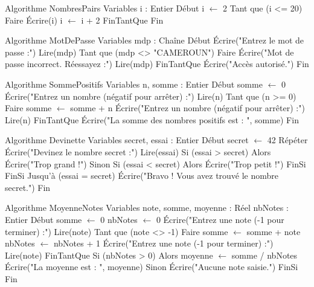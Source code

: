 \begin{algo}
Algorithme NombresPairs
Variables
    i : Entier
Début
    i $\leftarrow$ 2
    Tant que (i <= 20) Faire
        Écrire(i)
        i $\leftarrow$ i + 2
    FinTantQue
Fin
\end{algo}

\begin{algo}
Algorithme MotDePasse
Variables
    mdp : Chaîne
Début
    Écrire("Entrez le mot de passe :")
    Lire(mdp)
    Tant que (mdp <> "CAMEROUN") Faire
        Écrire("Mot de passe incorrect. Réessayez :")
        Lire(mdp)
    FinTantQue
    Écrire("Accès autorisé.")
Fin
\end{algo}

\begin{algo}
Algorithme SommePositifs
Variables
    n, somme : Entier
Début
    somme $\leftarrow$ 0
    Écrire("Entrez un nombre (négatif pour arrêter) :")
    Lire(n)
    Tant que (n >= 0) Faire
        somme $\leftarrow$ somme + n
        Écrire("Entrez un nombre (négatif pour arrêter) :")
        Lire(n)
    FinTantQue
    Écrire("La somme des nombres positifs est : ", somme)
Fin
\end{algo}

\begin{algo}
Algorithme Devinette
Variables
    secret, essai : Entier
Début
    secret $\leftarrow$ 42
    Répéter
        Écrire("Devinez le nombre secret :")
        Lire(essai)
        Si (essai > secret) Alors
            Écrire("Trop grand !")
        Sinon
            Si (essai < secret) Alors
                Écrire("Trop petit !")
            FinSi
        FinSi
    Jusqu'à (essai = secret)
    Écrire("Bravo ! Vous avez trouvé le nombre secret.")
Fin
\end{algo}

\begin{algo}
Algorithme MoyenneNotes
Variables
    note, somme, moyenne : Réel
    nbNotes : Entier
Début
    somme $\leftarrow$ 0
    nbNotes $\leftarrow$ 0
    Écrire("Entrez une note (-1 pour terminer) :")
    Lire(note)
    Tant que (note <> -1) Faire
        somme $\leftarrow$ somme + note
        nbNotes $\leftarrow$ nbNotes + 1
        Écrire("Entrez une note (-1 pour terminer) :")
        Lire(note)
    FinTantQue
    Si (nbNotes > 0) Alors
        moyenne $\leftarrow$ somme / nbNotes
        Écrire("La moyenne est : ", moyenne)
    Sinon
        Écrire("Aucune note saisie.")
    FinSi
Fin
\end{algo}

